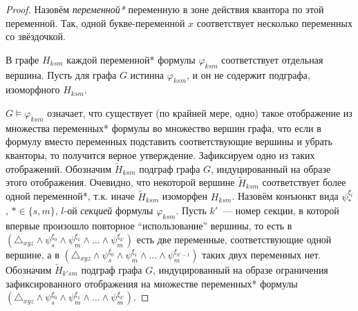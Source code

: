 \begin{proof}
Назовём \textit{переменной*} переменную в зоне действия квантора по этой переменной.
Так, одной букве-переменной $x$ соответствует несколько переменных со звёздочкой.

В графе $H_{ksm}$ каждой переменной* формулы $\varphi_{ksm}$ соответствует отдельная вершина.
Пусть для графа $G$ истинна $\varphi_{ksm}$, и он не содержит подграфа, изоморфного $H_{ksm}$.

$G \vDash \varphi_{ksm}$
означает, что существует (по крайней мере, одно) такое отображение из множества переменных* формулы во множество вершин графа, что если в формулу вместо переменных подставить соответствующие вершины и убрать кванторы, то получится верное утверждение.
Зафиксируем одно из таких отображений.
Обозначим $\tilde H_{ksm}$ подграф графа $G$, индуцированный на образе этого отображения.
Очевидно, что некоторой вершине $\tilde H_{ksm}$ соответствует более одной переменной*, т.к.  иначе $\tilde H_{ksm}$ изоморфен $H_{ksm}$.
Назовём конъюнкт вида $\psi^{\xi_l}_*$, $* \in \{s, m \}$, $l$-ой \textit{секцией} формулы $\varphi_{ksm}$.
Пусть $k'$~--- номер секции, в которой впервые произошло повторное ``использование'' вершины, то есть в $(\triangle_{xyz} \wedge \psi_{s}^{\xi_0} \wedge \psi_{m}^{\xi_1} \wedge \ldots \wedge \psi_{m}^{\xi_{k'}})$ есть две переменные, соответствующие одной вершине, а в $(\triangle_{xyz} \wedge \psi_{s}^{\xi_0} \wedge \psi_{m}^{\xi_1} \wedge \ldots \wedge \psi_{m}^{\xi_{k'-1}})$ таких двух переменных нет.
Обозначим $\tilde H_{k'sm}$ подграф графа $G$, индуцированный на образе ограничения зафиксированного отображения на множестве переменных* формулы $(\triangle_{xyz} \wedge \psi_{s}^{\xi_0} \wedge \psi_{m}^{\xi_1} \wedge \ldots \wedge \psi_{m}^{\xi_{k'}})$.


\end{proof}
